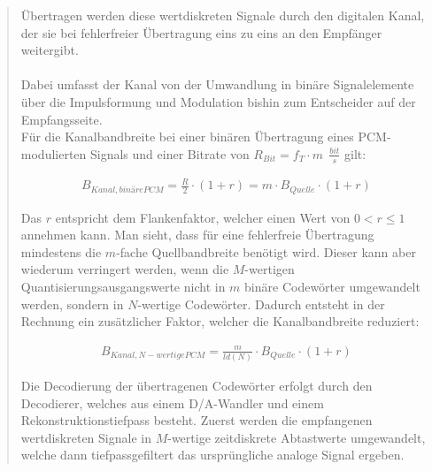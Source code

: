 \begin{quote}
	Übertragen werden diese wertdiskreten Signale durch den digitalen Kanal, der
	sie bei fehlerfreier Übertragung eins zu eins an den Empfänger weitergibt. \\
	 \\
	Dabei umfasst der Kanal von der Umwandlung in binäre Signalelemente über die
	Impulsformung und Modulation bishin zum Entscheider auf der Empfangsseite.\\
	Für die Kanalbandbreite bei einer binären Übertragung eines PCM-modulierten
	Signals und einer Bitrate von $R_{Bit} = f_T \cdot m \ \ \frac{bit}{s}$ gilt:
	 
       \begin{equation*}
        	\begin{split}
        		B_{Kanal,binäre PCM} = \frac{R}{2} \cdot (1+r)  =  m \cdot
        		B_{Quelle} \cdot (1+r)
        	\end{split}
        \end{equation*}        
        
	\vspace{0.5em}
	    
	Das $r$ entspricht dem Flankenfaktor, welcher einen Wert von $0 < r \leq 1$
	annehmen kann. Man sieht, dass für eine fehlerfreie Übertragung mindestens die
	 $m$-fache Quellbandbreite benötigt wird. Dieser kann aber wiederum verringert werden, wenn die $M$-wertigen
	Quantisierungsausgangswerte nicht in $m$ binäre Codewörter umgewandelt werden,
	sondern in $N$-wertige Codewörter. Dadurch entsteht in der Rechnung ein
	zusätzlicher Faktor, welcher die Kanalbandbreite reduziert:
	
	 \begin{equation*}
        	\begin{split}
        		B_{Kanal,N-wertige PCM} = \frac{m}{ld(N)} \cdot B_{Quelle} \cdot (1+r)
        	\end{split}
      \end{equation*}     
	
	\vspace{0.5em}
	
	Die Decodierung der übertragenen Codewörter erfolgt durch den Decodierer,
	welches aus einem D/A-Wandler und einem Rekonstruktionstiefpass besteht. Zuerst
	werden die empfangenen wertdiskreten Signale in $M$-wertige zeitdiskrete Abtastwerte
	umgewandelt, welche dann tiefpassgefiltert das ursprüngliche analoge Signal
	ergeben.\\
	

\end{quote}
